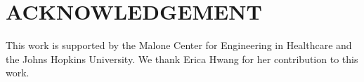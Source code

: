 \documentclass[letterpaper, 10 pt, conference]{ieeeconf}  %
\begin{document}
\section{ACKNOWLEDGEMENT}
This work is supported by the Malone Center for Engineering in Healthcare and the Johns Hopkins University. We thank Erica Hwang for her contribution to this work.




%
%
%
%
%
\end{document}
